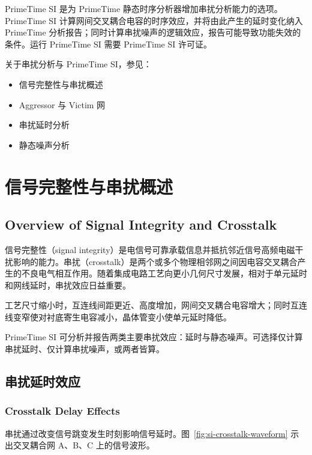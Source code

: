 \label{chap:si}

PrimeTime SI 是为 PrimeTime 静态时序分析器增加串扰分析能力的选项。PrimeTime SI 计算网间交叉耦合电容的时序效应，并将由此产生的延时变化纳入 PrimeTime 分析报告；同时计算串扰噪声的逻辑效应，报告可能导致功能失效的条件。运行 PrimeTime SI 需要 PrimeTime SI 许可证。

关于串扰分析与 PrimeTime SI，参见：
\begin{itemize}
  \item 信号完整性与串扰概述
  \item Aggressor 与 Victim 网
  \item 串扰延时分析
  \item 静态噪声分析
\end{itemize}

\section{信号完整性与串扰概述}
\subsection*{Overview of Signal Integrity and Crosstalk}

信号完整性（signal integrity）是电信号可靠承载信息并抵抗邻近信号高频电磁干扰影响的能力。串扰（crosstalk）是两个或多个物理相邻网之间因电容交叉耦合产生的不良电气相互作用。随着集成电路工艺向更小几何尺寸发展，相对于单元延时和网线延时，串扰效应日益重要。

工艺尺寸缩小时，互连线间距更近、高度增加，网间交叉耦合电容增大；同时互连线变窄使对衬底寄生电容减小，晶体管变小使单元延时降低。

PrimeTime SI 可分析并报告两类主要串扰效应：延时与静态噪声。可选择仅计算串扰延时、仅计算串扰噪声，或两者皆算。

\subsection{串扰延时效应}
\subsubsection*{Crosstalk Delay Effects}

串扰通过改变信号跳变发生时刻影响信号延时。图~\ref{fig:si-crosstalk-waveform} 示出交叉耦合网 A、B、C 上的信号波形。

